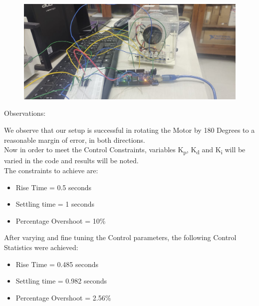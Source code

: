 \documentclass[12pt]{report}
\begin{document}
\vspace{50pt}

\begin{figure}[h!]
\center
\includegraphics[width=400pt]{Circuit2.jpeg}
\end{figure}



\newpage

\begin{Large}
Observations:\\
\end{Large}

We observe that our setup is successful in rotating the Motor by 180 Degrees to a reasonable margin of error, in both directions.\\

Now in order to meet the Control Constraints, variables K\textsubscript{p}, K\textsubscript{d} and K\textsubscript{i} will be varied in the code and results will be noted.\\

The constraints to achieve are:

\begin{itemize}
\item Rise Time = 0.5 seconds
\item Settling time = 1 seconds
\item Percentage Overshoot = 10\% 
\end{itemize} 

After varying and fine tuning the Control parameters, the following Control Statistics were achieved:\\

\begin{itemize}
\item Rise Time = 0.485 seconds
\item Settling time = 0.982 seconds
\item Percentage Overshoot = 2.56\% 
\end{itemize} 
\end{document}
